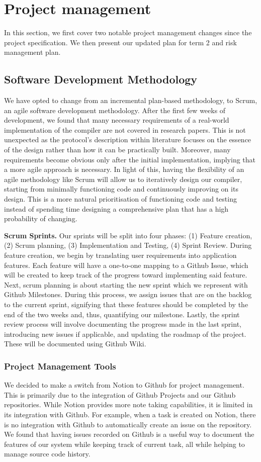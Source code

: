 \section{Project management}
In this section, we first cover two notable project management changes since the project specification. We then present our updated plan for term 2 and risk management plan.

\subsection{Software Development Methodology} 
We have opted to change from an incremental plan-based methodology, to Scrum, an agile software development methodology. After the first few weeks of development, we found that many necessary requirements of a real-world implementation of the compiler are not covered in research papers. This is not unexpected as the protocol's description within literature focuses on the essence of the design rather than how it can be practically built. Moreover, many requirements become obvious only after the initial implementation, implying that a more agile approach is necessary. In light of this, having the flexibility of an agile methodology like Scrum will allow us to iteratively design our compiler, starting from minimally functioning code and continuously improving on its design. This is a more natural prioritisation of functioning code and testing instead of spending time designing a comprehensive plan that has a high probability of changing.

\textbf{Scrum Sprints.} Our sprints will be split into four phases: (1) Feature creation, (2) Scrum planning, (3) Implementation and Testing, (4) Sprint Review. During feature creation, we begin by translating user requirements into application features. Each feature will have a one-to-one mapping to a Github Issue, which will be created to keep track of the progress toward implementing said feature. Next, scrum planning is about starting the new sprint which we represent with Github Milestones. During this process, we assign issues that are on the backlog to the current sprint, signifying that these features should be completed by the end of the two weeks and, thus, quantifying our milestone. Lastly, the sprint review process will involve documenting the progress made in the last sprint, introducing new issues if applicable, and updating the roadmap of the project. These will be documented using Github Wiki.

\subsubsection{Project Management Tools}
We decided to make a switch from Notion to Github for project management. This is primarily due to the integration of Github Projects and our Github repositories. While Notion provides more note taking capabilities, it is limited in its integration with Github. For example, when a task is created on Notion, there is no integration with Github to automatically create an issue on the repository. We found that having issues recorded on Github is a useful way to document the features of our system while keeping track of current task, all while helping to manage source code history. 

